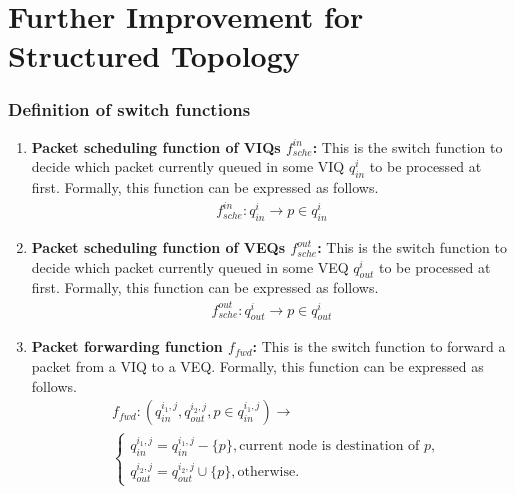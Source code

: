 \section{Further Improvement for Structured Topology}\label{sec:sol}




\subsubsection{Definition of switch functions}
 
\begin{enumerate}
	
	\item \textbf{Packet scheduling function of VIQs $f^{in}_{sche}$:} This is the switch function to decide which packet currently queued in some VIQ $q_{in}^{i}$ to be processed at first. Formally, this function can be expressed as follows. 
	\begin{align} \label{eqn:inschedule}
	 f^{in}_{sche}: q_{in}^{i} \longrightarrow p \in q_{in}^{i}
	\end{align}
	
	\item \textbf{Packet scheduling function of VEQs $f^{out}_{sche}$:} This is the switch function to decide which packet currently queued in some VEQ $q_{out}^{i}$ to be processed at first. Formally, this function can be expressed as follows. 
	\begin{align} \label{eqn:outschedule}
	f^{out}_{sche}: q_{out}^{i} \longrightarrow p \in q_{out}^{i}
	\end{align}
	
	\item \textbf{Packet forwarding function $ f_{fwd}$:} This is the switch function to forward a packet from a VIQ to a VEQ. Formally, this function can be expressed as follows. 
	\begin{align} \label{eqn:fwd}
	 &	f_{fwd}: (q_{in}^{i_1,j}, q_{out}^{i_2,j}, p\in q_{in}^{i_1,j})  \longrightarrow \nonumber \\
	 	&\begin{cases}
	 	 q_{in}^{i_1,j}=q_{in}^{i_1,j}-\{p\},  \text{current node is destination of } p,\\
	     q_{out}^{i_2,j}=q_{out}^{i_2,j}\cup\{p\}, \text{otherwise.} 
	 	\end{cases}
	\end{align}
	

\end{enumerate}
